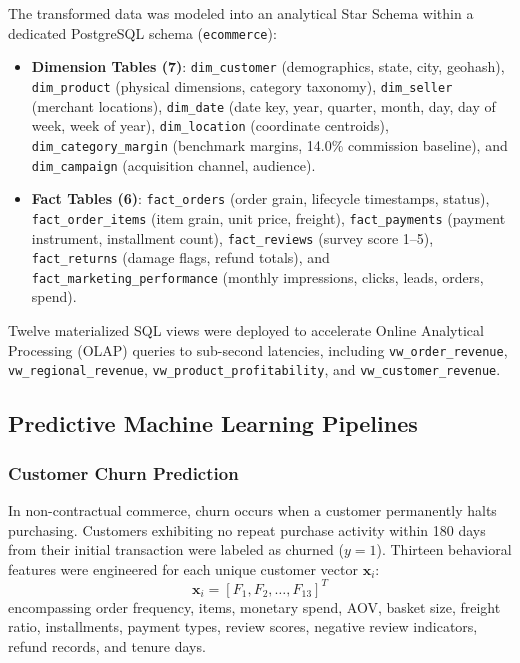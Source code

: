 \documentclass[conference]{IEEEtran}
\begin{document}
The transformed data was modeled into an analytical Star Schema within a dedicated PostgreSQL schema (\texttt{ecommerce}):
\begin{itemize}
    \item \textbf{Dimension Tables (7)}: \texttt{dim\_customer} (demographics, state, city, geohash), \texttt{dim\_product} (physical dimensions, category taxonomy), \texttt{dim\_seller} (merchant locations), \texttt{dim\_date} (date key, year, quarter, month, day, day of week, week of year), \texttt{dim\_location} (coordinate centroids), \texttt{dim\_category\_margin} (benchmark margins, 14.0\% commission baseline), and \texttt{dim\_campaign} (acquisition channel, audience).
    \item \textbf{Fact Tables (6)}: \texttt{fact\_orders} (order grain, lifecycle timestamps, status), \texttt{fact\_order\_items} (item grain, unit price, freight), \texttt{fact\_payments} (payment instrument, installment count), \texttt{fact\_reviews} (survey score 1--5), \texttt{fact\_returns} (damage flags, refund totals), and \texttt{fact\_marketing\_performance} (monthly impressions, clicks, leads, orders, spend).
\end{itemize}

Twelve materialized SQL views were deployed to accelerate Online Analytical Processing (OLAP) queries to sub-second latencies, including \texttt{vw\_order\_revenue}, \texttt{vw\_regional\_revenue}, \texttt{vw\_product\_profitability}, and \texttt{vw\_customer\_revenue}.

\subsection{Predictive Machine Learning Pipelines}

\subsubsection{Customer Churn Prediction}
In non-contractual commerce, churn occurs when a customer permanently halts purchasing. Customers exhibiting no repeat purchase activity within 180 days from their initial transaction were labeled as churned ($y=1$). Thirteen behavioral features were engineered for each unique customer vector $\mathbf{x}_i$:
\begin{equation}
\mathbf{x}_i = [F_1, F_2, \dots, F_{13}]^T
\end{equation}
encompassing order frequency, items, monetary spend, AOV, basket size, freight ratio, installments, payment types, review scores, negative review indicators, refund records, and tenure days.
\end{document}
